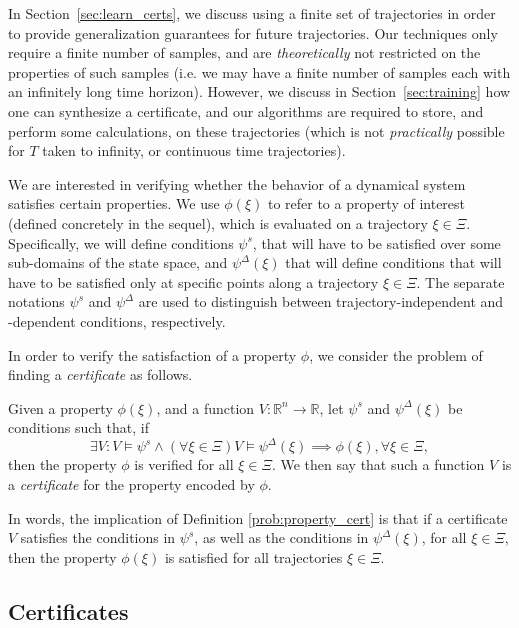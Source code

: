 In Section~\ref{sec:learn_certs}, we discuss using a finite set of trajectories in order to provide generalization guarantees for future trajectories. 
Our techniques only require a finite number of samples, and are \emph{theoretically} not restricted on the properties of such samples (i.e. we may have a finite number of samples each with an infinitely long time horizon). 
However, we discuss in Section~\ref{sec:training} how one can synthesize a certificate, and our algorithms are required to store, and perform some calculations, on these trajectories (which is not \emph{practically} possible for $T$ taken to infinity, or continuous time trajectories).

We are interested in verifying whether the behavior of a dynamical system satisfies certain properties.
We use $\phi(\xi)$ to refer to a property of interest (defined concretely in the sequel), which is evaluated on a trajectory $\xi \in \Xi$. Specifically, we
    will define conditions $\psi^s$, that will have to be satisfied over some sub-domains of the state space, and $\psi^\Delta (\xi)$ that will define conditions that will have to be satisfied only at specific points along a trajectory $\xi \in \Xi$. The separate notations $\psi^s$ and $\psi^\Delta$ are used to distinguish between trajectory-independent and -dependent conditions, respectively.
    
In order to verify the satisfaction of a property $\phi$, we consider the problem of finding a \emph{certificate} as follows.

\begin{defn}\label{prob:property_cert}
    Given a property $\phi(\xi)$, and a function $V\colon \mathbb{R}^n \rightarrow \mathbb{R}$, let $\psi^s$ and $\psi^\Delta (\xi)$ be conditions such that, if$$
            \exists V \colon V \models \psi^s\wedge (\forall \xi \in \Xi) V\models\psi^\Delta(\xi) \implies \phi(\xi), \forall \xi \in \Xi,$$
    then the property $\phi$ is verified for all $\xi \in \Xi$. We then say that such a function $V$ is a \emph{certificate} for the property encoded by $\phi$. 
\end{defn}
     
In words, the implication of Definition \ref{prob:property_cert} is that if a certificate $V$ satisfies the conditions in $\psi^s$, as well as the conditions in $\psi^\Delta (\xi)$, for all $\xi \in \Xi$, then the property $\phi(\xi)$ is satisfied for all trajectories $\xi \in \Xi$. 
\subsection{Certificates}

